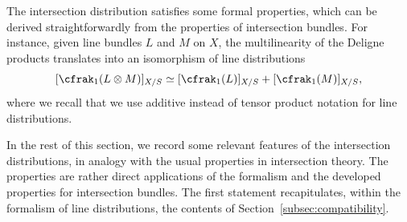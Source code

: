 The intersection distribution satisfies some formal properties, which can be derived straightforwardly from the properties of intersection bundles. For instance, given line bundles $L$ and $M$ on $X$, the multilinearity of the Deligne products translates into an isomorphism of line distributions
\begin{equation}\label{eq:c1-tensor-product-distribution}
[\cfrak_{1}(L\otimes M)]_{X/S}\simeq [\cfrak_{1}(L)]_{X/S}+[\cfrak_{1}(M)]_{X/S},
\end{equation}
where we recall that we use additive instead of tensor product notation for line distributions.

In the rest of this section, we record some relevant features of the intersection distributions, in analogy with the usual properties in intersection theory. The properties are rather direct applications of the formalism and the developed properties for intersection bundles. The first statement recapitulates, within the formalism of line distributions, the contents of Section~\ref{subsec:compatibility}.

